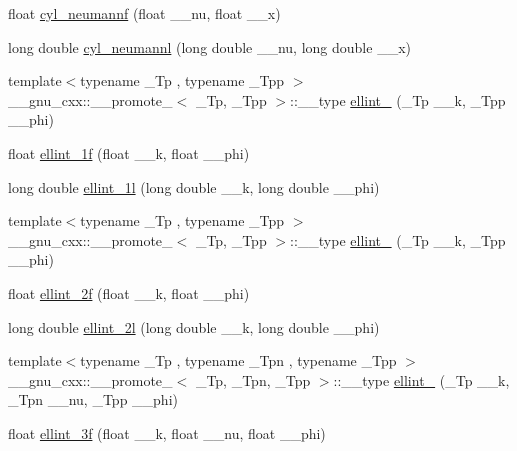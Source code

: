\begin{DoxyCompactItemize}
float \hyperlink{group__tr29124__math__spec__func_ga604c13e8f2bb7cd3c7c91d8b19d6b13a}{cyl\+\_\+neumannf} (float \+\_\+\+\_\+nu, float \+\_\+\+\_\+x)
\item 
long double \hyperlink{group__tr29124__math__spec__func_gaf8986bae9a523c48d861d233835bda8f}{cyl\+\_\+neumannl} (long double \+\_\+\+\_\+nu, long double \+\_\+\+\_\+x)
\item 
{\footnotesize template$<$typename \+\_\+\+Tp , typename \+\_\+\+Tpp $>$ }\\\+\_\+\+\_\+gnu\+\_\+cxx\+::\+\_\+\+\_\+promote\+\_$<$ \+\_\+\+Tp, \+\_\+\+Tpp $>$\+::\+\_\+\+\_\+type \hyperlink{group__tr29124__math__spec__func_gae6b3df5556f38a7d72f9b4457d856f9c}{ellint\+\_} (\+\_\+\+Tp \+\_\+\+\_\+k, \+\_\+\+Tpp \+\_\+\+\_\+phi)
\item 
float \hyperlink{group__tr29124__math__spec__func_ga308d23d70f4b5e848eb7a4173628ef3b}{ellint\+\_\+1f} (float \+\_\+\+\_\+k, float \+\_\+\+\_\+phi)
\item 
long double \hyperlink{group__tr29124__math__spec__func_ga795383fa51e02351000b410b478d824f}{ellint\+\_\+1l} (long double \+\_\+\+\_\+k, long double \+\_\+\+\_\+phi)
\item 
{\footnotesize template$<$typename \+\_\+\+Tp , typename \+\_\+\+Tpp $>$ }\\\+\_\+\+\_\+gnu\+\_\+cxx\+::\+\_\+\+\_\+promote\+\_$<$ \+\_\+\+Tp, \+\_\+\+Tpp $>$\+::\+\_\+\+\_\+type \hyperlink{group__tr29124__math__spec__func_gad6dd71db2b3f90d24ff49bf8cf37bc37}{ellint\+\_} (\+\_\+\+Tp \+\_\+\+\_\+k, \+\_\+\+Tpp \+\_\+\+\_\+phi)
\item 
float \hyperlink{group__tr29124__math__spec__func_ga594a730163c6228c75b152462700062b}{ellint\+\_\+2f} (float \+\_\+\+\_\+k, float \+\_\+\+\_\+phi)
\item 
long double \hyperlink{group__tr29124__math__spec__func_ga5c791332d374a809d8ca16c69a1a30f5}{ellint\+\_\+2l} (long double \+\_\+\+\_\+k, long double \+\_\+\+\_\+phi)
\item 
{\footnotesize template$<$typename \+\_\+\+Tp , typename \+\_\+\+Tpn , typename \+\_\+\+Tpp $>$ }\\\+\_\+\+\_\+gnu\+\_\+cxx\+::\+\_\+\+\_\+promote\+\_$<$ \+\_\+\+Tp, \+\_\+\+Tpn, \+\_\+\+Tpp $>$\+::\+\_\+\+\_\+type \hyperlink{group__tr29124__math__spec__func_ga20832e3a67d25cc3d415cafc88019ac3}{ellint\+\_} (\+\_\+\+Tp \+\_\+\+\_\+k, \+\_\+\+Tpn \+\_\+\+\_\+nu, \+\_\+\+Tpp \+\_\+\+\_\+phi)
\item 
float \hyperlink{group__tr29124__math__spec__func_ga1a80bd2c15bc9fbecda2630a9e9409e7}{ellint\+\_\+3f} (float \+\_\+\+\_\+k, float \+\_\+\+\_\+nu, float \+\_\+\+\_\+phi)

\end{DoxyCompactItemize}
